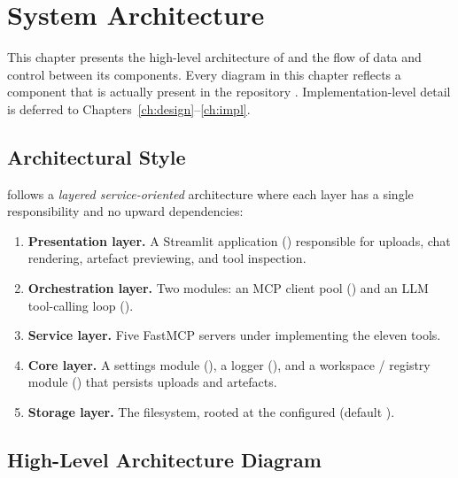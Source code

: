 \chapter{System Architecture}
\label{ch:arch}

This chapter presents the high-level architecture of \projname{} and
the flow of data and control between its components. Every diagram in
this chapter reflects a component that is actually present in the
repository . Implementation-level detail is
deferred to Chapters~\ref{ch:design}--\ref{ch:impl}.

\section{Architectural Style}
\label{sec:arch-style}

\projname{} follows a \emph{layered service-oriented} architecture
where each layer has a single responsibility and no upward
dependencies:

\begin{enumerate}[leftmargin=1.4em]
  \item \textbf{Presentation layer.} A Streamlit application
        () responsible for uploads, chat
        rendering, artefact previewing, and tool inspection.
  \item \textbf{Orchestration layer.} Two modules: an MCP client pool
        () and an LLM tool-calling loop
        ().
  \item \textbf{Service layer.} Five FastMCP servers under
         implementing the eleven tools.
  \item \textbf{Core layer.} A settings module
        (), a logger (),
        and a workspace / registry module
        () that persists uploads and
        artefacts.
  \item \textbf{Storage layer.} The filesystem, rooted at the
        configured  (default ).
\end{enumerate}

\section{High-Level Architecture Diagram}
\label{sec:high-level}

